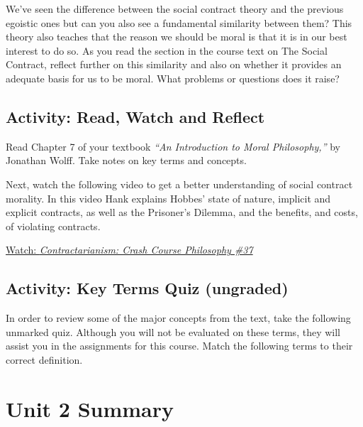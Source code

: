 \documentclass[
]{book}
\begin{document}
We've seen the difference between the social contract theory and the previous egoistic ones but can you also see a fundamental similarity between them? This theory also teaches that the reason we should be moral is that it is in our best interest to do so. As you read the section in the course text on The Social Contract, reflect further on this similarity and also on whether it provides an adequate basis for us to be moral. What problems or questions does it raise?

\hypertarget{activity-read-watch-and-reflect-4}{%
\subsection*{Activity: Read, Watch and Reflect}\label{activity-read-watch-and-reflect-4}}

\begin{reflect}
Read Chapter 7 of your textbook \emph{``An Introduction to Moral Philosophy,''} by Jonathan Wolff. Take notes on key terms and concepts.

Next, watch the following video to get a better understanding of social contract morality. In this video Hank explains Hobbes' state of nature, implicit and explicit contracts, as well as the Prisoner's Dilemma, and the benefits, and costs, of violating contracts.

\href{https://www.youtube.com/watch?v=2Co6pNvd9mc}{Watch: \emph{Contractarianism: Crash Course Philosophy \#37}}
\end{reflect}

\hypertarget{activity-key-terms-quiz-ungraded-1}{%
\subsection*{Activity: Key Terms Quiz (ungraded)}\label{activity-key-terms-quiz-ungraded-1}}

\begin{reflect}
In order to review some of the major concepts from the text, take the following unmarked quiz. Although you will not be evaluated on these terms, they will assist you in the assignments for this course. Match the following terms to their correct definition.
\end{reflect}

\hypertarget{unit-2-summary}{%
\section*{Unit 2 Summary}\label{unit-2-summary}}
\end{document}
